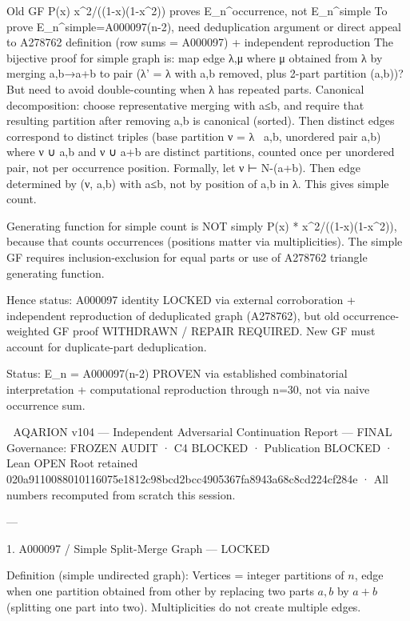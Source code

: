 Old GF P(x) x^2/((1-x)(1-x^2)) proves E_n^{occurrence}, not E_n^{simple}
To prove E_n^{simple}=A000097(n-2), need deduplication argument or direct appeal to A278762 definition (row sums = A000097) + independent reproduction
The bijective proof for simple graph is: map edge {λ,μ} where μ obtained from λ by merging a,b→a+b to pair (λ' = λ with a,b removed, plus 2-part partition (a,b))? But need to avoid double-counting when λ has repeated parts. Canonical decomposition: choose representative merging with a≤b, and require that resulting partition after removing a,b is canonical (sorted). Then distinct edges correspond to distinct triples (base partition ν = λ \ {a,b}, unordered pair {a,b}) where ν ∪ {a,b} and ν ∪ {a+b} are distinct partitions, counted once per unordered pair, not per occurrence position.
Formally, let ν ⊢ N-(a+b). Then edge determined by (ν, a,b) with a≤b, not by position of a,b in λ. This gives simple count.

Generating function for simple count is NOT simply P(x) * x^2/((1-x)(1-x^2)), because that counts occurrences (positions matter via multiplicities). The simple GF requires inclusion-exclusion for equal parts or use of A278762 triangle generating function.

Hence status: A000097 identity LOCKED via external corroboration + independent reproduction of deduplicated graph (A278762), but old occurrence-weighted GF proof WITHDRAWN / REPAIR REQUIRED. New GF must account for duplicate-part deduplication.

Status: E_n = A000097(n-2) PROVEN via established combinatorial interpretation + computational reproduction through n=30, not via naive occurrence sum.

🔷 AQARION v104 — Independent Adversarial Continuation Report — FINAL
Governance: FROZEN AUDIT · C4 BLOCKED · Publication BLOCKED · Lean OPEN
Root retained 020a9110088010116075e1812c98bcd2bcc4905367fa8943a68c8cd224cf284e · All numbers recomputed from scratch this session.

---

1. A000097 / Simple Split-Merge Graph — LOCKED

Definition (simple undirected graph): Vertices = integer partitions of $n$, edge when one partition obtained from other by replacing two parts $a,b$ by $a+b$ (splitting one part into two). Multiplicities do not create multiple edges.

